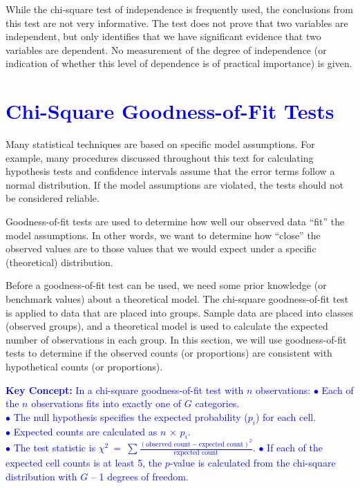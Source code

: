 \documentclass[
]{report}
\begin{document}
While the chi-square test of independence is frequently used, the conclusions from this test are not very informative. The test does not prove that two variables are independent, but only identifies that we have significant evidence that two variables are dependent. No measurement of the degree of independence (or indication of whether this level of dependence is of practical importance) is given.

\hypertarget{section-58}{%
\section{\texorpdfstring{\textcolor{blue}{Chi-Square Goodness-of-Fit Tests}}{}}\label{section-58}}

Many statistical techniques are based on specific model assumptions. For example, many procedures discussed throughout this text for calculating hypothesis tests and confidence intervals assume that the error terms follow a normal distribution. If the model assumptions are violated, the tests should not be considered reliable.

Goodness-of-fit tests are used to determine how well our observed data ``fit'' the model assumptions. In other words, we want to determine how ``close'' the observed values are to those values that we would expect under a specific (theoretical) distribution.

Before a goodness-of-fit test can be used, we need some prior knowledge (or benchmark values) about a theoretical model. The chi-square goodness-of-fit test is applied to data that are placed into groups. Sample data are placed into classes (observed groups), and a theoretical model is used to calculate the expected number of observations in each group. In this section, we will use goodness-of-fit tests to determine if the observed counts (or proportions) are consistent with hypothetical counts (or proportions).

\textbf{\textcolor{blue}{Key Concept:}}
\textcolor{blue}{In a chi-square goodness-of-fit test with $\scriptstyle n$ observations:}
\textcolor{blue}{$\bullet$ Each of the $\scriptstyle n$ observations fits into exactly one of $\scriptstyle G$ categories.}\\
\textcolor{blue}{$\bullet$ The null hypothesis specifies the expected probability ($\scriptstyle p_i$) for each cell.}\\
\textcolor{blue}{$\bullet$ Expected counts are calculated as $\scriptstyle n$ × $\scriptstyle p_i$.}\\
\textcolor{blue}{$\bullet$ The test statistic is $\scriptstyle \chi^2 \ =\  \sum \frac{(\text{observed count} - \text{expected count})^2}{\text{expected count}}$.}
\textcolor{blue}{$\bullet$ If each of the expected cell counts is at least 5, the $\scriptstyle p$-value is calculated from the chi-square distribution with $\scriptstyle G$ – 1 degrees of freedom.}
\end{document}
